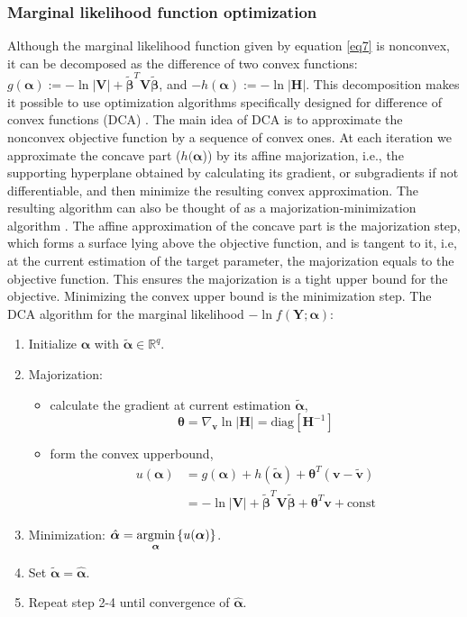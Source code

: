 \subsubsection{Marginal likelihood function optimization} \label{DCA}
Although the marginal likelihood function given by equation \eqref{eq7} is nonconvex, it can be decomposed as the difference of two convex functions: $g(\bm{\alpha}):=-\ln{|\bm{V}|} + \tilde{\bm{\beta}}^T\bm{V}\tilde{\bm{\beta}}$, and  $-h(\bm{\alpha}):=-\ln{|\bm{H}|}$. This decomposition makes it possible to use optimization algorithms specifically designed for difference of convex functions (DCA) \citep{le2015dc}. The main idea of DCA is to approximate the nonconvex objective function by a sequence of convex ones. At each iteration  we approximate the concave part ($h(\bm{\alpha}$)) by its affine majorization, i.e., the supporting hyperplane obtained by calculating its gradient, or subgradients if not differentiable, and then minimize the resulting convex approximation. The resulting algorithm can also be thought of as a majorization-minimization algorithm \citep{hunter2004tutorial}. The affine approximation of the concave part is the majorization step, which forms a surface lying above the objective function, and is tangent to it, i.e, at the current estimation of the target parameter, the majorization equals to the objective function. This ensures the majorization is a tight upper bound for the objective. Minimizing the convex upper bound is the minimization step. The DCA algorithm for the marginal likelihood $-\ln{f(\bm{Y};\bm{\alpha})}$:
\begin{enumerate}
    \item Initialize $\bm{\alpha}$ with $\tilde{\bm{\alpha}} \in \mathbb{R}^q$.
    \item Majorization: 
    \begin{itemize}
        \item calculate the gradient at current estimation $\tilde{\bm{\alpha}}$,
    $$\bm{\theta}= \nabla_{\bm{v}} \ln{|\bm{H}|} = \text{diag}[\bm{H}^{-1}]$$ 
        \item form the convex upperbound,
        \begin{align*}
        u(\bm{\alpha})&=g(\bm{\alpha})+ h(\tilde{\bm{\alpha}}) + \bm{\theta}^T(\bm{v}-\tilde{\bm{v}}) \\
        &=-\ln{|\bm{V}|} + \tilde{\bm{\beta}}^T\bm{V}\tilde{\bm{\beta}}+\bm{\theta}^T\bm{v}+\text{const}
        \end{align*}
    \end{itemize}
    \item Minimization: $\hat{\bm{\alpha}}=\underset{\bm{\alpha}}{\operatorname{\operatorname*{argmin}}} \left\{u(\bm{\alpha})\right\}$.
    \item Set $\tilde{\bm{\alpha}} = \hat{\bm{\alpha}}$.
    \item Repeat step 2-4 until convergence of $\hat{\bm{\alpha}}$.
\end{enumerate}
